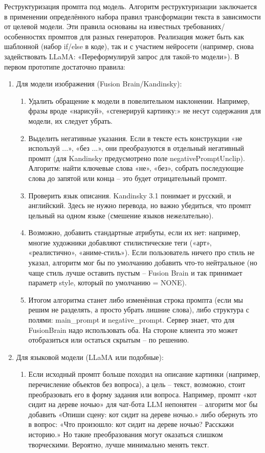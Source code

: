 Реструктуризация промпта под модель. Алгоритм реструктуризации заключается в применении определённого набора правил трансформации текста в зависимости от целевой модели. Эти правила основаны на известных требованиях/особенностях промптов для разных генераторов. Реализация может быть как шаблонной (набор if/else в коде), так и с участием нейросети (например, снова задействовать LLaMA: «Переформулируй запрос для такой-то модели»). В первом прототипе достаточно правила:
\begin{enumerate}[label=\arabic*.]
    \item Для модели изображения (Fusion Brain/Kandinsky):\begin{enumerate}[label=1.\arabic*.]
        \item Удалить обращение к модели в повелительном наклонении. Например, фразы вроде «нарисуй», «сгенерируй картинку:» не несут содержания для модели, их следует убрать.
        \item Выделить негативные указания. Если в тексте есть конструкции «не используй ...», «без ...», они преобразуются в отдельный негативный промпт (для Kandinsky предусмотрено поле negativePromptUnclip). Алгоритм: найти ключевые слова «не», «без», собрать последующие слова до запятой или конца – это будет отрицательный промпт.
        \item Проверить язык описания. Kandinsky 3.1 понимает и русский, и английский\cite{fusionbrain:docs}. Здесь не нужно перевода, но важно убедиться, что промпт цельный на одном языке (смешение языков нежелательно).
        \item Возможно, добавить стандартные атрибуты, если их нет: например, многие художники добавляют стилистические теги («арт», «реалистично», «аниме-стиль»). Если пользователь ничего про стиль не указал, алгоритм мог бы по умолчанию добавить что-то нейтральное (но чаще стиль лучше оставить пустым – Fusion Brain и так принимает параметр style, который по умолчанию = NONE).
        \item Итогом алгоритма станет либо изменённая строка промпта (если мы решим не разделять, а просто убрать лишние слова), либо структура с полями: main\_prompt и negative\_prompt. Сервер знает, что для FusionBrain надо использовать оба. На стороне клиента это может отобразиться или остаться скрытым – по решению.
    \end{enumerate}
    \item Для языковой модели (LLaMA или подобные): 
    \begin{enumerate}[label=2.\arabic*.]
        \item Если исходный промпт больше походил на описание картинки (например, перечисление объектов без вопроса), а цель – текст, возможно, стоит преобразовать его в форму задания или вопроса. Например, промпт «кот сидит на дереве ночью» для чат-бота LLM непонятен – алгоритм мог бы добавить «Опиши сцену: кот сидит на дереве ночью.» либо обернуть это в вопрос: «Что произошло: кот сидит на дереве ночью? Расскажи историю.» Но такие преобразования могут оказаться слишком творческими. Вероятно, лучше минимально менять текст.

\end{enumerate}
\end{enumerate}
